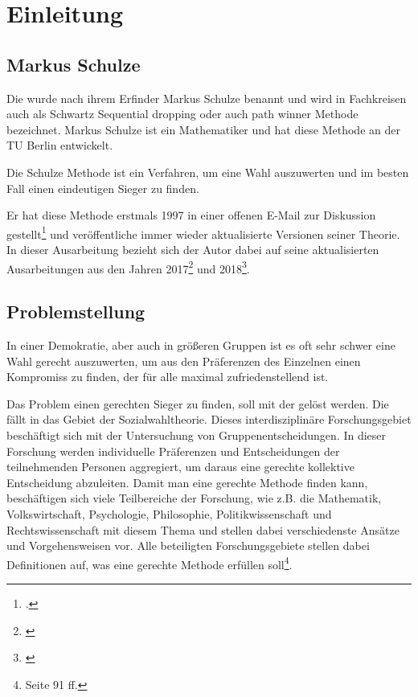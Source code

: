 \section{Einleitung}
\label{sec:Einleitung}


\subsection{Markus Schulze} 
\label{sec:markusSchulze}
Die \schulze wurde nach ihrem Erfinder Markus Schulze benannt und wird in Fachkreisen auch als \glqq Schwartz Sequential dropping\grqq{} oder auch \glqq path winner\grqq{} Methode bezeichnet. Markus Schulze ist ein Mathematiker und hat diese Methode an der TU Berlin entwickelt.

Die Schulze Methode ist ein Verfahren, um eine Wahl auszuwerten und im besten Fall einen eindeutigen Sieger zu finden.

Er hat diese Methode erstmals 1997 in einer offenen E-Mail zur Diskussion gestellt\footnote{\Vgl \citet{Schulze1997}.} und veröffentliche immer wieder aktualisierte Versionen seiner Theorie. In dieser Ausarbeitung bezieht sich der Autor dabei auf seine aktualisierten Ausarbeitungen aus den Jahren 2017\footnote{\Vgl \citet{Schulze2017}} und 2018\footnote{\Vgl \citet{Schulze2018}}.

\subsection{Problemstellung} 
\label{sec:problemstellung}
In einer Demokratie, aber auch in größeren Gruppen ist es oft sehr schwer eine Wahl gerecht auszuwerten, um aus den Präferenzen des Einzelnen einen Kompromiss zu finden, der für alle maximal zufriedenstellend ist.

Das Problem einen gerechten Sieger zu finden, soll mit der \schulze gelöst werden. Die \schulze fällt in das Gebiet der Sozialwahltheorie. Dieses interdisziplinäre Forschungsgebiet beschäftigt sich mit der Untersuchung von Gruppenentscheidungen. In dieser Forschung werden individuelle Präferenzen und Entscheidungen der teilnehmenden Personen aggregiert, um daraus eine \glqq gerechte\grqq{} kollektive Entscheidung abzuleiten. Damit man eine \glqq gerechte\grqq{} Methode finden kann, beschäftigen sich viele Teilbereiche der Forschung, wie z.B. die Mathematik, Volkswirtschaft, Psychologie, Philosophie, Politikwissenschaft und Rechtswissenschaft mit diesem Thema und stellen dabei verschiedenste Ansätze und Vorgehensweisen vor. Alle beteiligten Forschungsgebiete stellen dabei Definitionen auf, was eine \glqq gerechte\grqq{} Methode erfüllen soll\footnote{\Vgl \citet{scheubrein2013computerunterstuetzte} Seite 91 ff.}.

